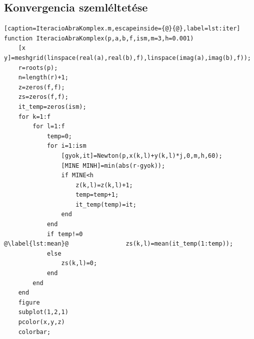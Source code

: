 \documentclass[a4paper,12pt]{report}
\begin{document}
\begin{appendices}
		\section{Konvergencia szemléltetése} \label{Konvergencia}
			\begin{lstlisting}[caption=IteracioAbraKomplex.m,escapeinside={@}{@},label=lst:iter]
function IteracioAbraKomplex(p,a,b,f,ism,m=3,h=0.001)                               
    [x y]=meshgrid(linspace(real(a),real(b),f),linspace(imag(a),imag(b),f));
    r=roots(p);                                                             
    n=length(r)+1;                                                          
    z=zeros(f,f);                                                           
    zs=zeros(f,f);                                                          
    it_temp=zeros(ism);                                                     
    for k=1:f                                                               
        for l=1:f                                                           
            temp=0;                                                         
            for i=1:ism                                                     
                [gyok,it]=Newton(p,x(k,l)+y(k,l)*j,0,m,h,60);               
                [MINE MINH]=min(abs(r-gyok));                               
                if MINE<h                                                   
                    z(k,l)=z(k,l)+1;                                        
                    temp=temp+1;                                            
                    it_temp(temp)=it;                                       
                end                                                         
            end                                                             
            if temp!=0                                                      
@\label{lst:mean}@                zs(k,l)=mean(it_temp(1:temp)); 
            else                                                            
                zs(k,l)=0;                                                  
            end                                                             
        end                                                                 
    end                                                            
    figure                                                                  
    subplot(1,2,1)                                                          
    pcolor(x,y,z)                                                           
    colorbar;                                                               

\end{lstlisting}
\end{appendices}
\end{document}
